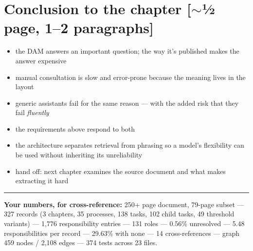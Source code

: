 \documentclass[11pt,a4paper]{article}
\newcommand{\len}[1]{\hfill\textcolor{gr}{\small[#1]}}
\begin{document}
\section*{Conclusion to the chapter \len{$\sim$½ page, 1--2 paragraphs}}
\begin{itemize}
\item the DAM answers an important question; the way it's published makes the answer expensive
\item manual consultation is slow and error-prone because the meaning lives in the layout
\item generic assistants fail for the same reason --- with the added risk that they fail \emph{fluently}
\item the requirements above respond to both
\item the architecture separates retrieval from phrasing so a model's flexibility
can be used without inheriting its unreliability
\item hand off: next chapter examines the source document and what makes extracting it hard
\end{itemize}

\vspace{10pt}
\hrule
\vspace{6pt}
\textbf{Your numbers, for cross-reference:} 250+ page document, 79-page subset ---
327 records (3 chapters, 35 processes, 138 tasks, 102 child tasks, 49 threshold
variants) --- 1,776 responsibility entries --- 131 roles --- 0.56\% unresolved ---
5.48 responsibilities per record --- 29.63\% with none --- 14 cross-references ---
graph 459 nodes / 2,108 edges --- 374 tests across 23 files.
\end{document}
